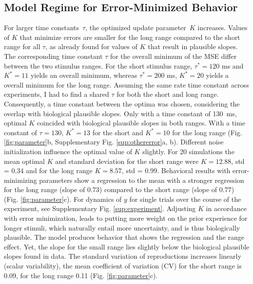 \documentclass[10pt]{article}
\begin{document}
\subsection{Model Regime for Error-Minimized Behavior} 
For larger time constants~$\tau$, the optimized update parameter~$K$ increases. Values of $K$ that minimize errors are smaller for the long range compared to the short range for all $\tau$, as already found for values of $K$ that result in plausible slopes.
The corresponding time constant $\tau$ for the overall minimum of the MSE differ between the two stimulus ranges. For the short stimulus range, $\tau^* = 120$ ms and $K^* = 11$ yields an overall minimum, whereas $\tau^* = 200$ ms, $K^* = 20$ yields a overall minimum for the long range. 
Assuming the same rate time constant across experiments, I had to find a shared $\tau$ for both the short and long range. Consequently, a time constant between the optima was chosen, considering the overlap with biological plausible slopes. Only with a time constant of 130~ms, optimal $K$ coincided with biological plausible slopes in both ranges. 
With a time constant of $\tau = 130$, $K^* = 13$ for the short and $K^* = 10$ for the long range (Fig. \ref{fig:parameter}b, Supplementary Fig. \ref{sup:othererror}a, b).
Different noise initialization influence the optimal value of $K$ slightly. For 20 simulations the mean optimal $K$ and standard deviation for the short range were $K = 12.88$, std = 0.34 and for the long range $K = 8.57$, std = 0.99. 
Behavioral results with error-minimizing parameters show a regression to the mean with a stronger regression for the long range (slope of 0.73) compared to the short range (slope of 0.77) (Fig. \ref{fig:parameter}c). For dynamics of $y$ for single trials over the course of the experiment, see Supplementary Fig. \ref{sup:experiment}.
Adjusting $K$ in accordance with error minimization, leads to putting more weight on the prior experience for longer stimuli, which naturally entail more uncertainty, and is thus biologically plausible.
The model produces behavior that shows the regression and the range effect.
Yet, the slope for the small range lies slightly below the biological plausible slopes found in data. 
The standard variation of reproductions increases linearly (scalar variability), the mean coefficient of variation (CV) for the short range is 0.09, for the long range 0.11 (Fig. \ref{fig:parameter}c).
\end{document}
